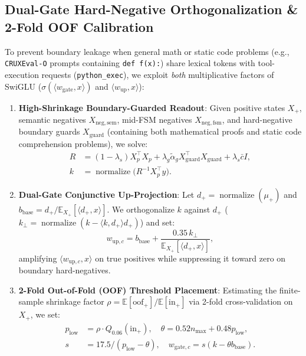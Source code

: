 \documentclass[10pt,twocolumn]{article}
\begin{document}
\subsection{Dual-Gate Hard-Negative Orthogonalization \& 2-Fold OOF Calibration}
To prevent boundary leakage when general math or static code problems (e.g., \texttt{CRUXEval-O} prompts containing \texttt{def f(x):}) share lexical tokens with tool-execution requests (\texttt{python\_exec}), we exploit \emph{both} multiplicative factors of SwiGLU ($\sigma(\langle w_{\mathrm{gate}}, x \rangle)$ and $\langle w_{\mathrm{up}}, x \rangle$):
\begin{enumerate}
    \item \textbf{High-Shrinkage Boundary-Guarded Readout}: Given positive states $X_+$, semantic negatives $X_{\mathrm{neg,sem}}$, mid-FSM negatives $X_{\mathrm{neg,fsm}}$, and hard-negative boundary guards $X_{\mathrm{guard}}$ (containing both mathematical proofs and static code comprehension problems), we solve:
    \begin{equation}
    \begin{aligned}
    R &= (1-\lambda_s) X_p^\top X_p + \lambda_g \tilde{\alpha}_g X_{\mathrm{guard}}^\top X_{\mathrm{guard}} + \lambda_s \bar{c} I, \\
    k &= \operatorname{normalize}\big(R^{-1} X_p^\top y\big).
    \end{aligned}
    \end{equation}
    \item \textbf{Dual-Gate Conjunctive Up-Projection}: Let $d_+ = \operatorname{normalize}(\mu_+)$ and $b_{\mathrm{base}} = d_+ / \mathbb{E}_{X_+}[\langle d_+, x \rangle]$. We orthogonalize $k$ against $d_+$ ($k_\perp = \operatorname{normalize}(k - \langle k, d_+ \rangle d_+)$) and set:
    \begin{equation}
    w_{\mathrm{up},c} = b_{\mathrm{base}} + \frac{0.35 \, k_\perp}{\mathbb{E}_{X_+}[\langle d_+, x \rangle]},
    \end{equation}
    amplifying $\langle w_{\mathrm{up},c}, x \rangle$ on true positives while suppressing it toward zero on boundary hard-negatives.
    \item \textbf{2-Fold Out-of-Fold (OOF) Threshold Placement}: Estimating the finite-sample shrinkage factor $\rho = \mathbb{E}[\mathrm{oof}_+] / \mathbb{E}[\mathrm{in}_+]$ via 2-fold cross-validation on $X_+$, we set:
    \begin{equation}
    \begin{aligned}
    p_{\mathrm{low}} &= \rho \cdot Q_{0.06}(\mathrm{in}_+), \quad \theta = 0.52 n_{\max} + 0.48 p_{\mathrm{low}}, \\
    s &= 17.5 / (p_{\mathrm{low}} - \theta), \quad w_{\mathrm{gate},c} = s(k - \theta b_{\mathrm{base}}).
    \end{aligned}
    \end{equation}
\end{enumerate}
\end{document}
